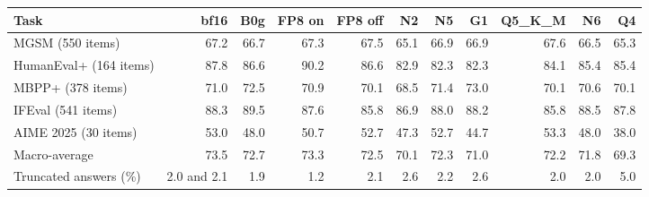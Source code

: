 \begin{tabular}{@{}lrrrrrrrrrr@{}}
\toprule
Task & bf16 & B0g & FP8 on & FP8 off & N2 & N5 & G1 & Q5\_K\_M & N6 & Q4 \\
\midrule
MGSM (550 items) & 67.2 & 66.7 & 67.3 & 67.5 & 65.1 & 66.9 & 66.9 & 67.6 & 66.5 & 65.3 \\
HumanEval+ (164 items) & 87.8 & 86.6 & 90.2 & 86.6 & 82.9 & 82.3 & 82.3 & 84.1 & 85.4 & 85.4 \\
MBPP+ (378 items) & 71.0 & 72.5 & 70.9 & 70.1 & 68.5 & 71.4 & 73.0 & 70.1 & 70.6 & 70.1 \\
IFEval (541 items) & 88.3 & 89.5 & 87.6 & 85.8 & 86.9 & 88.0 & 88.2 & 85.8 & 88.5 & 87.8 \\
AIME 2025 (30 items) & 53.0 & 48.0 & 50.7 & 52.7 & 47.3 & 52.7 & 44.7 & 53.3 & 48.0 & 38.0 \\
\midrule
Macro-average & 73.5 & 72.7 & 73.3 & 72.5 & 70.1 & 72.3 & 71.0 & 72.2 & 71.8 & 69.3 \\
Truncated answers (\%) & 2.0 and 2.1 & 1.9 & 1.2 & 2.1 & 2.6 & 2.2 & 2.6 & 2.0 & 2.0 & 5.0 \\
\bottomrule
\end{tabular}
